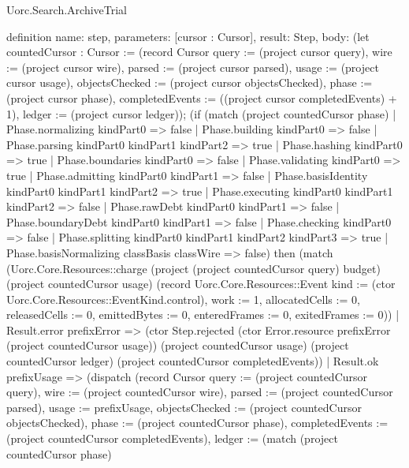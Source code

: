 \begin{lexlean}{Uorc.Search.ArchiveTrial}
\begin{semanticmodule}
definition{
  name: step,
  parameters: [cursor : Cursor],
  result: Step,
  body: (let countedCursor : Cursor := (record Cursor {query := (project cursor query), wire := (project cursor wire), parsed := (project cursor parsed), usage := (project cursor usage), objectsChecked := (project cursor objectsChecked), phase := (project cursor phase), completedEvents := ((project cursor completedEvents) + 1), ledger := (project cursor ledger)}); (if (match (project countedCursor phase)
    | Phase.normalizing kindPart0 => false
    | Phase.building kindPart0 => false
    | Phase.parsing kindPart0 kindPart1 kindPart2 => true
    | Phase.hashing kindPart0 => true
    | Phase.boundaries kindPart0 => false
    | Phase.validating kindPart0 => true
    | Phase.admitting kindPart0 kindPart1 => false
    | Phase.basisIdentity kindPart0 kindPart1 kindPart2 => true
    | Phase.executing kindPart0 kindPart1 kindPart2 => false
    | Phase.rawDebt kindPart0 kindPart1 => false
    | Phase.boundaryDebt kindPart0 kindPart1 => false
    | Phase.checking kindPart0 => false
    | Phase.splitting kindPart0 kindPart1 kindPart2 kindPart3 => true
    | Phase.basisNormalizing classBasis classWire => false) then (match (Uorc.Core.Resources::charge (project (project countedCursor query) budget) (project countedCursor usage) (record Uorc.Core.Resources::Event {kind := (ctor Uorc.Core.Resources::EventKind.control), work := 1, allocatedCells := 0, releasedCells := 0, emittedBytes := 0, enteredFrames := 0, exitedFrames := 0}))
    | Result.error prefixError => (ctor Step.rejected (ctor Error.resource prefixError (project countedCursor usage)) (project countedCursor usage) (project countedCursor ledger) (project countedCursor completedEvents))
    | Result.ok prefixUsage => (dispatch (record Cursor {query := (project countedCursor query), wire := (project countedCursor wire), parsed := (project countedCursor parsed), usage := prefixUsage, objectsChecked := (project countedCursor objectsChecked), phase := (project countedCursor phase), completedEvents := (project countedCursor completedEvents), ledger := (match (project countedCursor phase)
}}
\end{semanticmodule}
\end{lexlean}
